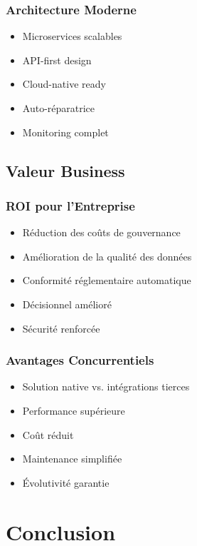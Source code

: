 \documentclass[12pt,a4paper]{article}
\begin{document}
\subsubsection{Architecture Moderne}
\begin{itemize}
    \item Microservices scalables
    \item API-first design
    \item Cloud-native ready
    \item Auto-réparatrice
    \item Monitoring complet
\end{itemize}

\subsection{Valeur Business}

\subsubsection{ROI pour l'Entreprise}
\begin{itemize}
    \item Réduction des coûts de gouvernance
    \item Amélioration de la qualité des données
    \item Conformité réglementaire automatique
    \item Décisionnel amélioré
    \item Sécurité renforcée
\end{itemize}

\subsubsection{Avantages Concurrentiels}
\begin{itemize}
    \item Solution native vs. intégrations tierces
    \item Performance supérieure
    \item Coût réduit
    \item Maintenance simplifiée
    \item Évolutivité garantie
\end{itemize}

\section{Conclusion}
\end{document}
